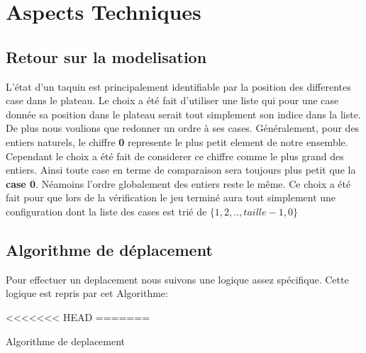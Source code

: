 \documentclass[12pt]{article}
\begin{document}
\newpage
\section{Aspects Techniques}
\subsection{Retour sur la modelisation}
L'état d'un taquin est principalement identifiable par la position des differentes case dans le plateau.
Le choix a été fait d'utiliser une liste qui pour une case donnée sa position dans le plateau serait tout
simplement son indice dans la liste.\\

De plus nous voulions que redonner un ordre à ses cases. Généralement, pour des entiers naturels, le chiffre
\textbf{0} represente le plus petit element de notre ensemble. Cependant le choix a été fait de considerer ce chiffre
comme le plus grand des entiers. Ainsi toute case en terme de comparaison sera toujours plus petit que la \textbf{case 0}.
Néamoins l'ordre globalement des entiers reste le même. Ce choix a été fait pour que lors de la vérification
le jeu terminé aura tout simplement une configuration dont la liste des cases est trié de
$\{1, 2, .., taille-1, 0\}$

\subsection{Algorithme de déplacement}
Pour effectuer un deplacement nous suivons une logique assez spécifique. Cette logique est
repris par cet Algorithme:

\begin{algorithm}[h!]

	\DontPrintSemicolon

<<<<<<< HEAD
=======



	\Return{$\ListeCases$}
	\caption{Algorithme de deplacement}
\end{algorithm}
\end{document}
